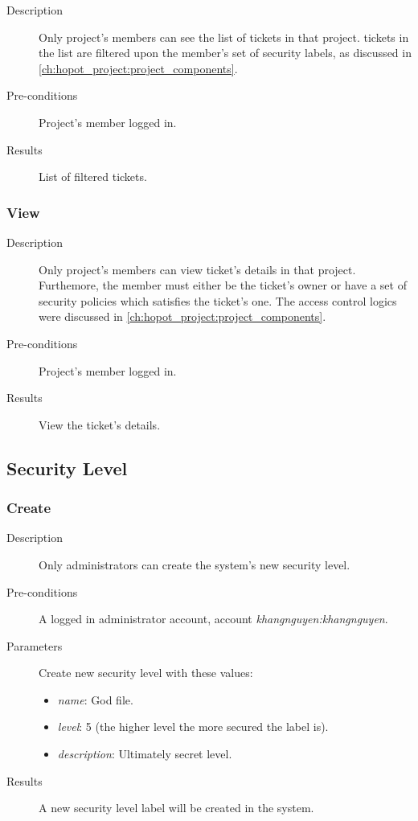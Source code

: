 \begin{description}
\item[Description] Only project's members can see the list of tickets in that project.
tickets in the list are filtered upon the member's set of security labels, as discussed in \autoref{ch:hopot_project:project_components}.
\item[Pre-conditions] Project's member logged in.
\item[Results] List of filtered tickets.
\end{description}

\subsubsection{View}
\label{ch:result:user_guide:ticket:list}

\begin{description}
\item[Description] Only project's members can view ticket's details in that project.
Furthemore, the member must either be the ticket's owner or have a set of security policies which satisfies the ticket's one.
The access control logics were discussed in \autoref{ch:hopot_project:project_components}.
\item[Pre-conditions] Project's member logged in.
\item[Results] View the ticket's details.
\end{description}

\subsection{Security Level}
\label{ch:result:user_guide:security_level}
\subsubsection{Create}
\label{ch:result:user_guide:security_level:create}

\begin{description}
\item[Description] Only administrators can create the system's new security level.
\item[Pre-conditions] A logged in administrator account, \eg account \emph{khangnguyen:khangnguyen}.
\item[Parameters] Create new security level with these values:
\begin{itemize}
\item \emph{name}: God file.
\item \emph{level}: 5 (the higher level the more secured the label is).
\item \emph{description}: Ultimately secret level.
\end{itemize}
\item[Results] A new security level label will be created in the system.
\end{description}

